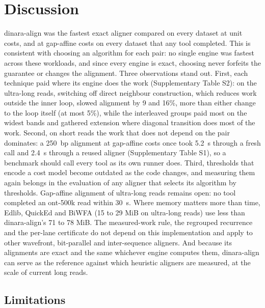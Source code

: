 \section{Discussion}

dinara-align was the fastest exact aligner compared on every dataset at unit costs, and at gap-affine costs on every dataset that any tool completed. This is consistent with choosing an algorithm for each pair: no single engine was fastest across these workloads, and since every engine is exact, choosing never forfeits the guarantee or changes the alignment. Three observations stand out. First, each technique paid where its engine does the work (Supplementary Table S2): on the ultra-long reads, switching off direct neighbour construction, which reduces work outside the inner loop, slowed alignment by 9 and 16\%, more than either change to the loop itself (at most 5\%), while the interleaved groups paid most on the widest bands and gathered extension where diagonal transition does most of the work. Second, on short reads the work that does not depend on the pair dominates: a 250~bp alignment at gap-affine costs once took 5.2~\textmu s through a fresh call and 2.4~\textmu s through a reused aligner (Supplementary Table S1), so a benchmark should call every tool as its own runner does. Third, thresholds that encode a cost model become outdated as the code changes, and measuring them again belongs in the evaluation of any aligner that selects its algorithm by thresholds. Gap-affine alignment of ultra-long reads remains open: no tool completed an ont-500k read within 30~s. Where memory matters more than time, Edlib, QuickEd and BiWFA (15 to 29 MiB on ultra-long reads) use less than dinara-align's 71 to 78 MiB. The measured-work rule, the regrouped recurrence and the per-lane certificate do not depend on this implementation and apply to other wavefront, bit-parallel and inter-sequence aligners. And because its alignments are exact and the same whichever engine computes them, dinara-align can serve as the reference against which heuristic aligners are measured, at the scale of current long reads.

\subsection{Limitations}

